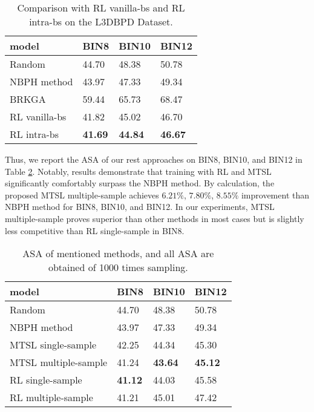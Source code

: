 \begin{table}[!htb]
	\centering
	\caption{Comparison with RL vanilla-bs and RL intra-bs on the L3DBPD Dataset.  }
	\label{rl result}
	\begin{tabular}{l|l l l}
		\hline
		model &   BIN8 & BIN10 & BIN12 \\ \hline
		Random &  44.70 & 48.38 & 50.78 \\ 
		NBPH method & 43.97 & 47.33 & 49.34 \\
		BRKGA  &59.44 & 65.73 & 68.47 \\
		RL vanilla-bs & 41.82 & 45.02 & 46.70 \\ 
		RL intra-bs & \textbf{41.69} & \textbf{44.84} & \textbf{46.67} \\ \hline
	\end{tabular}
\end{table}

Thus, we report the ASA of our rest approaches on BIN8, BIN10, and BIN12 in Table \ref{bin result}. Notably, results demonstrate that training with RL and MTSL significantly comfortably surpass the NBPH method. By calculation, the proposed MTSL multiple-sample achieves $6.21\%$, $7.80\%$, $8.55\%$ improvement than NBPH method for BIN8, BIN10, and BIN12. In our experiments, MTSL multiple-sample proves superior than other methods in most cases but is slightly less competitive than RL single-sample in BIN8.

\begin{table}[!htb]
	\centering
	\caption{ASA of mentioned methods, and all ASA are obtained of 1000 times sampling. }
	\label{bin result}
	\begin{tabular}{l|l l l}
		\hline
		model &   BIN8 & BIN10 & BIN12 \\ \hline
		Random &  44.70 & 48.38 & 50.78 \\ 
		NBPH method & 43.97 & 47.33 & 49.34 \\ 
		MTSL single-sample & 42.25 & 44.34 & 45.30 \\ 
		MTSL multiple-sample & 41.24 & \textbf{43.64} & \textbf{45.12} \\ 
		RL single-sample & \textbf{41.12} & 44.03 & 45.58 \\ 
		RL multiple-sample & 41.21 & 45.01 & 47.42 \\ \hline
	\end{tabular}
\end{table}

